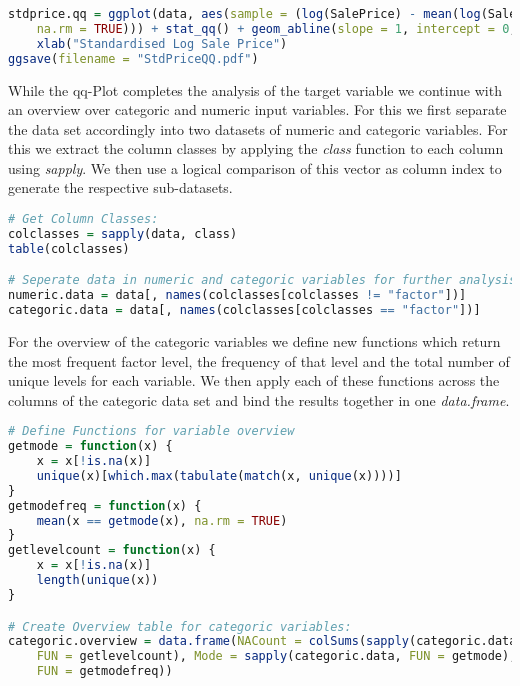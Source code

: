 \begin{lstlisting}[language=R]
stdprice.qq = ggplot(data, aes(sample = (log(SalePrice) - mean(log(SalePrice), na.rm = TRUE))/sd(log(SalePrice), 
    na.rm = TRUE))) + stat_qq() + geom_abline(slope = 1, intercept = 0, col = "red") + ggtitle("QQ-Plot of Standardised Log Sale Price") + 
    xlab("Standardised Log Sale Price")
ggsave(filename = "StdPriceQQ.pdf")
\end{lstlisting}

While the qq-Plot completes the analysis of the target variable  we continue with an overview over categoric and numeric input variables. For this we first separate the data set accordingly into two datasets of numeric and categoric variables. For this we extract the column classes by applying the \textit{class} function to each column using \textit{sapply}. We then use a logical comparison of this vector as column index to generate the respective sub-datasets.
\begin{lstlisting}[language=R]
# Get Column Classes:
colclasses = sapply(data, class)
table(colclasses)

# Seperate data in numeric and categoric variables for further analysis
numeric.data = data[, names(colclasses[colclasses != "factor"])]
categoric.data = data[, names(colclasses[colclasses == "factor"])]
\end{lstlisting}
For the overview of the categoric variables we define new functions which return the most frequent factor level, the frequency of that level and the total number of unique levels for each variable. We then apply each of these functions across the columns of the categoric data set and bind the results together in one \textit{data.frame}.
\begin{lstlisting}[language=R]
# Define Functions for variable overview
getmode = function(x) {
    x = x[!is.na(x)]
    unique(x)[which.max(tabulate(match(x, unique(x))))]
}
getmodefreq = function(x) {
    mean(x == getmode(x), na.rm = TRUE)
}
getlevelcount = function(x) {
    x = x[!is.na(x)]
    length(unique(x))
}

# Create Overview table for categoric variables:
categoric.overview = data.frame(NACount = colSums(sapply(categoric.data, is.na)), LevelCount = sapply(categoric.data, 
    FUN = getlevelcount), Mode = sapply(categoric.data, FUN = getmode), ModeFrequency = sapply(categoric.data, 
    FUN = getmodefreq))
\end{lstlisting} 

